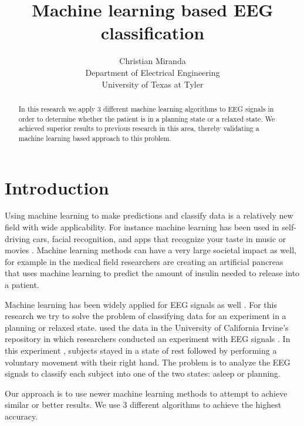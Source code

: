 \documentclass[conference,compsoc]{IEEEtran}
\begin{document}
\author{Christian Miranda\\Department of Electrical Engineering\\University of Texas at Tyler}
\title{Machine learning based EEG classification}
\maketitle

\begin{abstract}
In this research we apply 3 different machine learning algorithms to EEG signals in order to determine whether the patient is in a planning state or a relaxed state.  We achieved superior results to previous research in this area, thereby validating a machine learning based approach to this problem.

\end{abstract}

\section{Introduction}
Using machine learning to make predictions and classify data is a relatively new field with wide applicability.  For instance machine learning has been used in self-driving cars, facial recognition, and apps that recognize your taste in music or movies \cite{machine,cars}.  Machine learning methods can have a very large societal impact as well, for example in the medical field researchers are creating an artificial pancreas that uses machine learning \cite{diabetes} to predict the amount of insulin needed to release into a patient.

Machine learning has been widely applied for EEG signals as well \cite{wavelet}. For this research we try to solve the problem of classifying data for an experiment in a planning or relaxed state.  used the data in the University of California Irvine's repository in which researchers conducted an experiment with EEG signals \cite{classsvm}.  In this experiment \cite{rp}, subjects stayed in a state of rest followed by performing a voluntary movement with their right hand. The problem is to analyze the EEG signals to classify each subject into one of the two states: asleep or planning. 

Our approach is to use newer machine learning methods to attempt to achieve similar or better results. We use 3 different algorithms to achieve the highest accuracy. %
\end{document}
